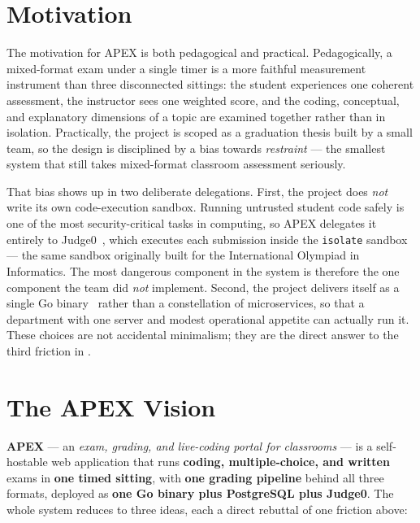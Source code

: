 \section{Motivation}

The motivation for APEX is both pedagogical and practical. Pedagogically, a
mixed-format exam under a single timer is a more faithful measurement instrument
than three disconnected sittings: the student experiences one coherent
assessment, the instructor sees one weighted score, and the coding, conceptual,
and explanatory dimensions of a topic are examined together rather than in
isolation. Practically, the project is scoped as a graduation thesis built by a
small team, so the design is disciplined by a bias towards \emph{restraint} ---
the smallest system that still takes mixed-format classroom assessment
seriously.

That bias shows up in two deliberate delegations. First, the project does
\emph{not} write its own code-execution sandbox. Running untrusted student code
safely is one of the most security-critical tasks in computing, so APEX
delegates it entirely to Judge0~\cite{judge0}, which executes each submission
inside the \texttt{isolate} sandbox~\cite{isolate} --- the same sandbox
originally built for the International Olympiad in Informatics. The most
dangerous component in the system is therefore the one component the team did
\emph{not} implement. Second, the project delivers itself as a single Go
binary~\cite{go} rather than a constellation of microservices, so that a
department with one server and modest operational appetite can actually run it.
These choices are not accidental minimalism; they are the direct answer to the
third friction in .

\section{The APEX Vision}

\textbf{APEX} --- an \emph{exam, grading, and live-coding portal for
classrooms} --- is a self-hostable web application that runs \textbf{coding,
multiple-choice, and written} exams in \textbf{one timed sitting}, with
\textbf{one grading pipeline} behind all three formats, deployed as
\textbf{one Go binary plus PostgreSQL plus Judge0}. The whole system reduces to
three ideas, each a direct rebuttal of one friction above:

